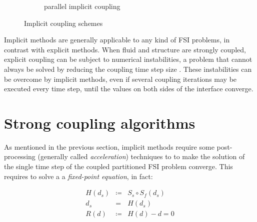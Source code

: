 \begin{figure}[htbp!]
\begin{subfigure}{.8\textwidth}
		\caption{parallel implicit coupling}
		\label{fig:parallel-implicit}
	\end{subfigure}
	\caption{Implicit coupling schemes}
\end{figure}

Implicit methods are generally applicable to any kind of FSI problems, in contrast with explicit methods. When fluid and structure are strongly coupled, explicit coupling can be subject to numerical instabilities, a problem that cannot always be solved by reducing the coupling time step size \cite{van2009added}. These instabilities can be overcome by implicit methods, even if several coupling iterations may be executed every time step, until the values on both sides of the interface converge.


\section{Strong coupling algorithms}
\label{sec:strong-coupling}

As mentioned in the previous section, implicit methods require some post-processing (generally called \textit{acceleration}) techniques to to make the solution of the single time step of the coupled partitioned FSI problem converge. This requires to solve a a \textit{fixed-point equation}, in fact:

\begin{subequations}
	\begin{eqnarray}
		\label{eq:fp-def}
		H(d_s) &\coloneqq&  S_s  \circ S_f(d_s)  \\
		\label{eq:fp-2}
		d_s &=& H(d_s)  \\
		\label{eq:fp3}
		R(d) &\coloneqq& H(d) - d = 0
	\end{eqnarray} 
	\label{eq:fp-equations}
\end{subequations}

